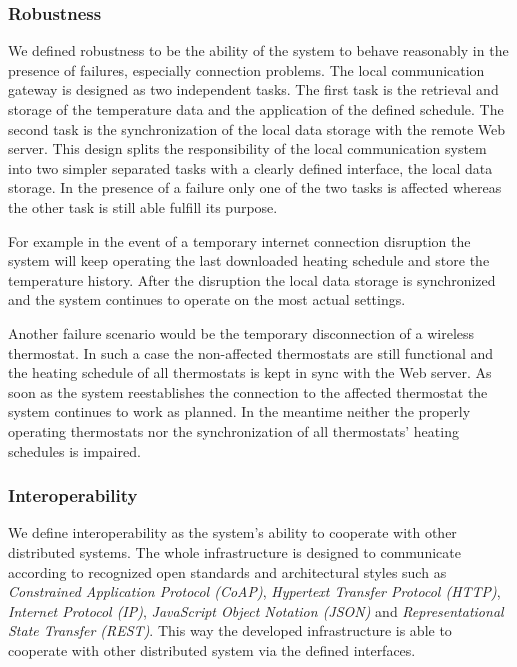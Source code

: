 \subsubsection{Robustness}

We defined robustness to be the ability of the system to behave reasonably in the presence of failures, especially connection problems.
The local communication gateway is designed as two independent tasks.
The first task is the retrieval and storage of the temperature data and the application of the defined schedule.
The second task is the synchronization of the local data storage with the remote Web server.
This design splits the responsibility of the local communication system into two simpler separated tasks with a clearly defined interface, the local data storage.
In the presence of a failure only one of the two tasks is affected whereas the other task is still able fulfill its purpose.

For example in the event of a temporary internet connection disruption the system will keep operating the last downloaded heating schedule and store the temperature history.
After the disruption the local data storage is synchronized and the system continues to operate on the most actual settings.

Another failure scenario would be the temporary disconnection of a wireless thermostat.
In such a case the non-affected thermostats are still functional and the heating schedule of all thermostats is kept in sync with the Web server.
As soon as the system reestablishes the connection to the affected thermostat the system continues to work as planned.
In the meantime neither the properly operating thermostats nor the synchronization of all thermostats' heating schedules is impaired.







\subsubsection{Interoperability}

We define interoperability as the system's ability to cooperate with other distributed systems.
The whole infrastructure is designed to communicate according to recognized open standards and architectural styles such as \emph{Constrained Application Protocol (CoAP)}, \emph{Hypertext Transfer Protocol (HTTP)}, \emph{Internet Protocol (IP)}, \emph{JavaScript Object Notation (JSON)} and \emph{Representational State Transfer (REST)}.
This way the developed infrastructure is able to cooperate with other distributed system via the defined interfaces.


